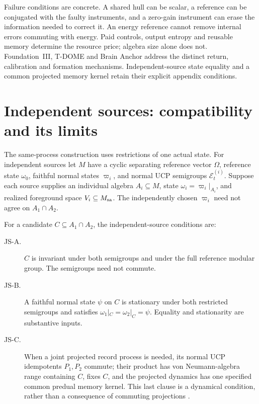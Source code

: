 \documentclass[12pt]{article}
\theoremstyle{definition}
\theoremstyle{remark}
\begin{document}
Failure conditions are concrete. A shared hull can be scalar, a
reference can be conjugated with the faulty instruments, and a
zero-gain instrument can erase the information needed to correct it.
An energy reference cannot remove internal errors commuting with
energy. Paid controls, output entropy and reusable memory determine
the resource price; algebra size alone does not. Foundation~III,
T-DOME and Brain Anchor address the distinct return, calibration and
formation mechanisms. Independent-source state equality and a common
projected memory kernel retain their explicit appendix conditions.

\appendix

\section{Independent sources: compatibility and its limits}\label{sec:datum}

The same-process construction uses restrictions of one actual state. For
independent sources let \(M\) have a cyclic separating reference vector
\(\Omega\), reference state \(\omega_0\), faithful normal states
\(\varpi_i\), and normal UCP semigroups \(\mathcal E_t^{(i)}\).
Suppose each source supplies an individual algebra
\(A_i\subseteq M\), state \(\omega_i=\varpi_i|_{A_i}\), and realized
foreground space \(V_i\subseteq M_{\rm sa}\).
The independently chosen \(\varpi_i\) need not agree on \(A_1\cap A_2\).

For a candidate \(C\subseteq A_1\cap A_2\), the independent-source
conditions are:
\begin{description}
\item[JS-A.] \(C\) is invariant under both semigroups and under the full
reference modular group. The semigroups need not commute.
\item[JS-B.] A faithful normal state \(\psi\) on \(C\) is stationary
under both restricted semigroups and satisfies \(\omega_1|_C=\omega_2|_C=\psi\).
Equality and stationarity are substantive inputs.
\item[JS-C.] When a joint projected record process is needed, its normal
UCP idempotents \(P_1,P_2\) commute; their product has von Neumann-algebra
range containing \(C\), fixes \(C\), and the projected dynamics has one
specified common predual memory kernel. This last clause is a dynamical
condition, rather than a consequence of commuting projections
\cite{Nakajima1958,Zwanzig1960}.
\end{description}
\end{document}
